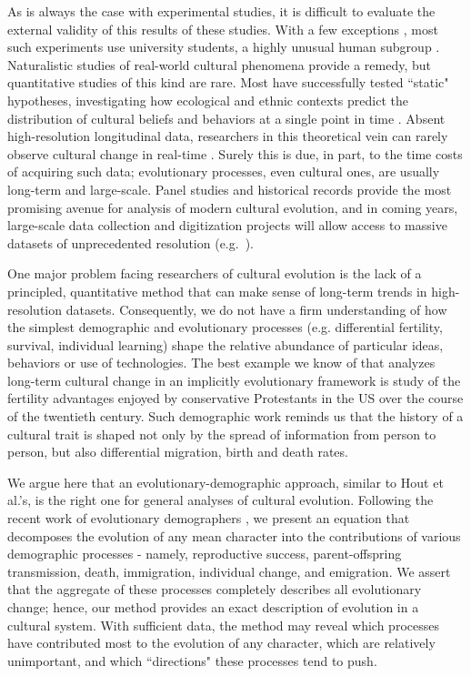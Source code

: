 \documentclass[11pt]{article}
\begin{document}
As is always the case with experimental studies, it is difficult to evaluate the external validity of this results of these studies.  With a few exceptions \citep{paciotti2003ultimatum, efferson2007learning, chudek2011prestige}, most such experiments use university students, a highly unusual human subgroup \citep{henrich2010weirdest}. Naturalistic studies of real-world cultural phenomena provide a remedy, but quantitative studies of this kind are rare. Most have successfully tested ``static" hypotheses, investigating how ecological and ethnic contexts predict the distribution of cultural beliefs and behaviors at a single point in time \citep{paciotti2003ultimatum, mcelreath2004social, henrich2010evolution, henrich2011nature}. Absent high-resolution longitudinal data, researchers in this theoretical vein can rarely observe cultural change in real-time \citep{gravlee2009methods}. Surely this is due, in part, to the time costs of acquiring such data; evolutionary processes, even cultural ones, are usually long-term and large-scale. Panel studies and historical records provide the most promising avenue for analysis of modern cultural evolution, and in coming years, large-scale data collection and digitization projects will allow access to massive datasets of unprecedented resolution (e.g.~\citealp{michel2011quantitative}).

One major problem facing researchers of cultural evolution is the lack of a principled, quantitative method that can make sense of long-term trends in high-resolution datasets. Consequently, we do not have a firm understanding of how the simplest demographic and evolutionary processes (e.g. differential fertility, survival, individual learning) shape the relative abundance of particular ideas, behaviors or use of technologies.  The best example we know of that analyzes long-term cultural change in an implicitly evolutionary framework is \cite{hout2001demographic} study of the fertility advantages enjoyed by conservative Protestants in the US over the course of the twentieth century. Such demographic work reminds us that the history of a cultural trait is shaped not only by the spread of information from person to person, but also differential migration, birth and death rates.

We argue here that an evolutionary-demographic approach, similar to Hout et al.'s, is the right one for general analyses of cultural evolution. Following the recent work of evolutionary demographers \citep{coulson2008dynamics, ozgul2009dynamics}, we present an equation that decomposes the evolution of any mean character into the contributions of various demographic processes - namely, reproductive success, parent-offspring transmission, death, immigration, individual change, and emigration. We assert that the aggregate of these processes completely describes all evolutionary change; hence, our method provides an exact description of evolution in a cultural system.  With sufficient data, the method may reveal which processes have contributed most to the evolution of any character, which are relatively unimportant, and which ``directions" these processes tend to push.
\end{document}
